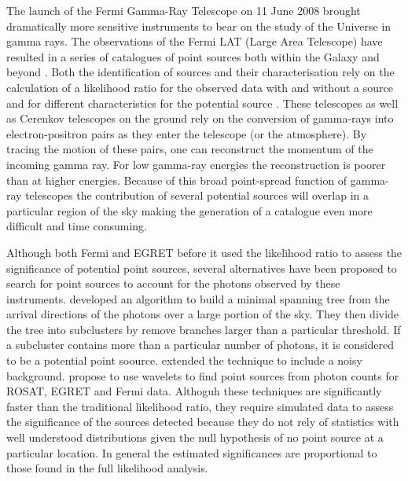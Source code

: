 \documentclass[useAMS,usenatbib]{mn2e}
\begin{document}
The launch of the Fermi Gamma-Ray Telescope on 11 June 2008 brought
dramatically more sensitive instruments to bear on the study of the
Universe in gamma rays.  The observations of the Fermi LAT (Large Area
Telescope) \citep[e.g.][]{2012ApJS..203....4A} have resulted in a
series of catalogues of point sources both within the Galaxy and
beyond \citep[e.g.][]{2010ApJS..188..405A,2011ApJ...743..171A,
  2012ApJS..199...31N,2013ApJS..208...17A,
  2013ApJS..209...34A,2015ApJS..218...23A}.  Both the identification
of sources and their characterisation rely on the calculation of a
likelihood ratio for the observed data with and without a source and
for different characteristics for the potential source
\citep{1979ApJ...228..939C,1992MNRAS.259..413S,1996ApJ...461..396M}.
These telescopes as well as Cerenkov telescopes on the ground rely on
the conversion of gamma-rays into electron-positron pairs as they
enter the telescope (or the atmosphere).  By tracing the motion of
these pairs, one can reconstruct the momentum of the incoming gamma
ray.  For low gamma-ray energies the reconstruction is poorer than at
higher energies.  Because of this broad point-spread function of
gamma-ray telescopes the contribution of several potential sources
will overlap in a particular region of the sky making the generation
of a catalogue even more difficult and time consuming.

Although both Fermi and EGRET before it used the likelihood ratio to
assess the significance of potential point sources, several
alternatives have been proposed to search for point sources to account
for the photons observed by these instruments.
\citet{2009arXiv0912.3843M,2008MNRAS.383.1166C} developed an algorithm
to build a minimal spanning tree from the arrival directions of the
photons over a large portion of the sky.  They then divide the tree
into subclusters by remove branches larger than a particular
threshold.  If a subcluster contains more than a particular number of
photons, it is considered to be a potential point soource.
\citet{2013Ap&SS.347..169C} extended the technique to include a noisy
background.
\citet{1997ApJ...483..350D,1997ApJ...483..370D,2007AIPC..921..546C}
propose to use wavelets to find point sources from photon counts for
ROSAT, EGRET and Fermi data.  Althoguh these techniques are
significantly faster than the traditional likelihood ratio, they
require simulated data to assess the significance of the sources
detected because they do not rely of statistics with well understood
distributions given the null hypothesis of no point source at a
particular location.  In general the estimated significances are
proportional to those found in the full likelihood analysis.
\end{document}
